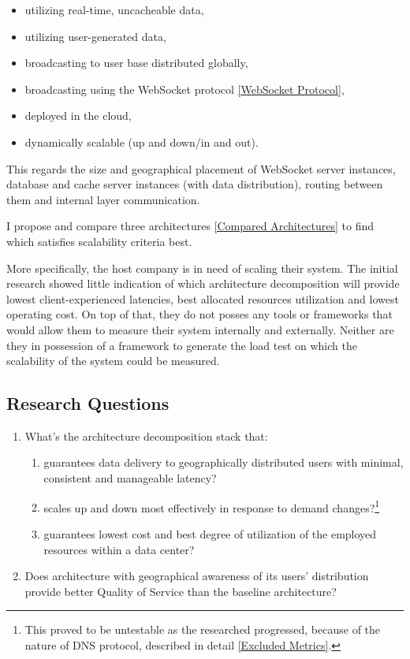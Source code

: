 \documentclass{uvamscse}
\begin{document}
\begin{itemize}
  \item utilizing real-time, uncacheable data,
  \item utilizing user-generated data,
  \item broadcasting to user base distributed globally,
  \item broadcasting using the WebSocket protocol \ref{WebSocket Protocol},
  \item deployed in the cloud,
  \item dynamically scalable (up and down/in and out).
\end{itemize}

This regards the size and geographical placement of WebSocket server instances, database and cache server instances (with data distribution), routing between them and internal layer communication.

I propose and compare three architectures \ref{Compared Architectures} to find which satisfies scalability criteria best.

More specifically, the host company is in need of scaling their system. The initial research showed little indication of which architecture decomposition will provide lowest client-experienced latencies, best allocated resources utilization and lowest operating cost. On top of that, they do not posses any tools or frameworks that would allow them to measure their system internally and externally. Neither are they in possession of a framework to generate the load test on which the scalability of the system could be measured.

\subsection{Research Questions}\label{Research Questions}
\begin{enumerate}
  \item What's the architecture decomposition stack that:
    \begin{enumerate}
      \item guarantees data delivery to geographically distributed users with minimal, consistent and manageable latency?
      \item scales up and down most effectively in response to demand changes?\footnote{This proved to be untestable as the researched progressed, because of the nature of DNS protocol, described in detail \ref{Excluded Metrics}.}
      \item guarantees lowest cost and best degree of utilization of the employed resources within a data center?
    \end{enumerate}
  \item Does architecture with geographical awareness of its users' distribution provide better Quality of Service than the baseline architecture?
\end{enumerate}
\end{document}
